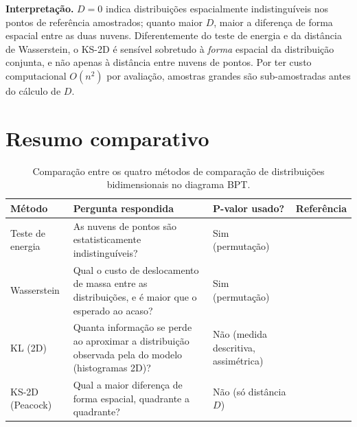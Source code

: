 \documentclass[11pt,a4paper]{article}
\begin{document}
\textbf{Interpretação.} $D = 0$ indica distribuições espacialmente
indistinguíveis nos pontos de referência amostrados; quanto maior $D$,
maior a diferença de forma espacial entre as duas nuvens. Diferentemente
do teste de energia e da distância de Wasserstein, o KS-2D é sensível
sobretudo à \emph{forma} espacial da distribuição conjunta, e não
apenas à distância entre nuvens de pontos. Por ter custo computacional
$O(n^2)$ por avaliação, amostras grandes são sub-amostradas antes do
cálculo de $D$.

\section{Resumo comparativo}

\begin{table}[h!]
\centering
\begin{tabular}{@{}p{2.7cm}p{5.5cm}p{3cm}p{2.2cm}@{}}
\toprule
\textbf{Método} & \textbf{Pergunta respondida} & \textbf{P-valor usado?} & \textbf{Referência} \\
\midrule
Teste de energia & As nuvens de pontos são estatisticamente indistinguíveis? & Sim (permutação) & \cite{szekely2004,szekely2013} \\
Wasserstein & Qual o custo de deslocamento de massa entre as distribuições, e é maior que o esperado ao acaso? & Sim (permutação) & \cite{villani2009,kantorovich1942} \\
KL (2D) & Quanta informação se perde ao aproximar a distribuição observada pela do modelo (histogramas 2D)? & Não (medida descritiva, assimétrica) & \cite{kullback1951} \\
KS-2D (Peacock) & Qual a maior diferença de forma espacial, quadrante a quadrante? & Não (só distância $D$) & \cite{peacock1983,fasano1987} \\
\bottomrule
\end{tabular}
\caption{Comparação entre os quatro métodos de comparação de distribuições
bidimensionais no diagrama BPT.}
\end{table}
\end{document}
